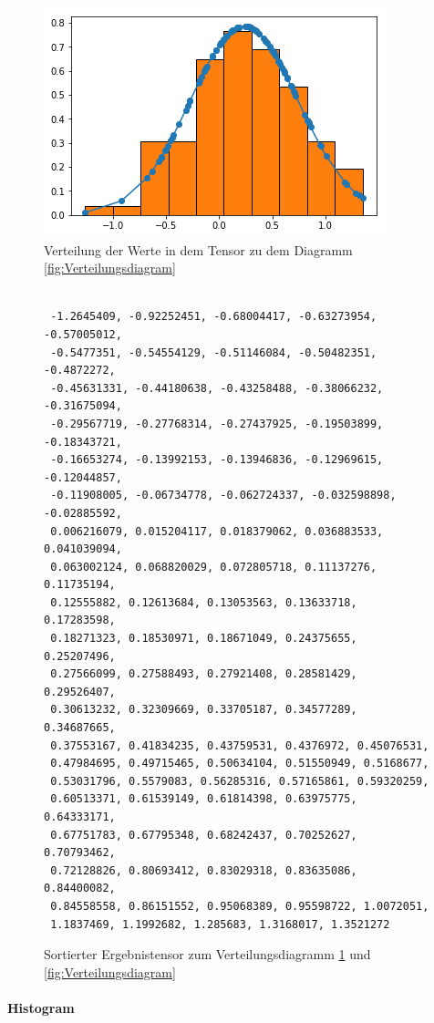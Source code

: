 \begin{figure}
	\centering
	\includegraphics[scale=0.8]{images/gaussian.png}
	\caption{Verteilung der Werte in dem Tensor zu dem Diagramm \ref{fig:Verteilungsdiagram}}
	\label{fig:VerteilungsdiagrammPython}
\end{figure}

\begin{figure}

\lstset{language=Python}
\begin{lstlisting}

 -1.2645409, -0.92252451, -0.68004417, -0.63273954, -0.57005012, 
 -0.5477351, -0.54554129, -0.51146084, -0.50482351, -0.4872272, 
 -0.45631331, -0.44180638, -0.43258488, -0.38066232, -0.31675094, 
 -0.29567719, -0.27768314, -0.27437925, -0.19503899, -0.18343721, 
 -0.16653274, -0.13992153, -0.13946836, -0.12969615, -0.12044857, 
 -0.11908005, -0.06734778, -0.062724337, -0.032598898, -0.02885592, 
 0.006216079, 0.015204117, 0.018379062, 0.036883533, 0.041039094, 
 0.063002124, 0.068820029, 0.072805718, 0.11137276, 0.11735194, 
 0.12555882, 0.12613684, 0.13053563, 0.13633718, 0.17283598, 
 0.18271323, 0.18530971, 0.18671049, 0.24375655, 0.25207496, 
 0.27566099, 0.27588493, 0.27921408, 0.28581429, 0.29526407, 
 0.30613232, 0.32309669, 0.33705187, 0.34577289, 0.34687665, 
 0.37553167, 0.41834235, 0.43759531, 0.4376972, 0.45076531, 
 0.47984695, 0.49715465, 0.50634104, 0.51550949, 0.5168677, 
 0.53031796, 0.5579083, 0.56285316, 0.57165861, 0.59320259, 
 0.60513371, 0.61539149, 0.61814398, 0.63975775, 0.64333171, 
 0.67751783, 0.67795348, 0.68242437, 0.70252627, 0.70793462, 
 0.72128826, 0.80693412, 0.83029318, 0.83635086, 0.84400082, 
 0.84558558, 0.86151552, 0.95068389, 0.95598722, 1.0072051, 
 1.1837469, 1.1992682, 1.285683, 1.3168017, 1.3521272

\end{lstlisting}

	\caption{Sortierter Ergebnistensor zum Verteilungsdiagramm \ref{fig:VerteilungsdiagrammPython} und \ref{fig:Verteilungsdiagram}}
	\label{fig:Ergebnistensor}
\end{figure}




\paragraph{Histogram} 















